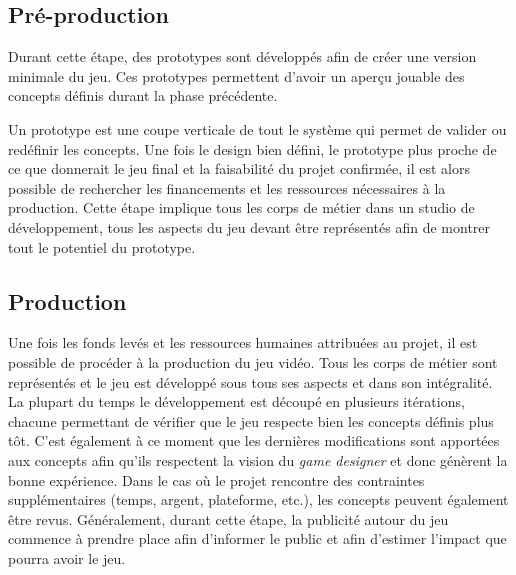 \subsection{Pré-production}
Durant cette étape, des prototypes sont développés afin de créer une version minimale du jeu.
Ces prototypes permettent d'avoir un aperçu jouable des concepts définis durant la phase précédente. 

Un prototype est une coupe verticale de tout le système qui permet de valider ou redéfinir les concepts.
Une fois le design bien défini, le prototype plus proche de ce que donnerait le jeu final et la faisabilité du projet confirmée, il est alors possible de rechercher les financements et les ressources nécessaires à la production.
Cette étape implique tous les corps de métier dans un studio de développement, tous les aspects du jeu devant être représentés afin de montrer tout le potentiel du prototype.

\subsection{Production}
Une fois les fonds levés et les ressources humaines attribuées au projet, il est possible de procéder à la production du jeu vidéo.
Tous les corps de métier sont représentés et le jeu est développé sous tous ses aspects et dans son intégralité.
La plupart du temps le développement est découpé en plusieurs itérations,
chacune permettant de vérifier que le jeu respecte bien les concepts définis plus tôt.
C'est également à ce moment que les dernières modifications sont apportées aux concepts afin qu'ils respectent la vision du \emph{game designer} et donc génèrent la bonne expérience.
Dans le cas o\`u le projet rencontre des contraintes supplémentaires (temps, argent, plateforme, etc.), les concepts peuvent également être revus.
Généralement, durant cette étape, la publicité autour du jeu commence à prendre place afin d'informer le public et afin d'estimer l'impact que pourra avoir le jeu.

